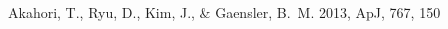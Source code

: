 \begin{thebibliography}{99}
\begin{multicols}{2}{\footnotesize

Akahori, T., Ryu, D., Kim, J., \& Gaensler, B.~M. 2013, ApJ, 767, 150



}\end{multicols}
\end{thebibliography}
